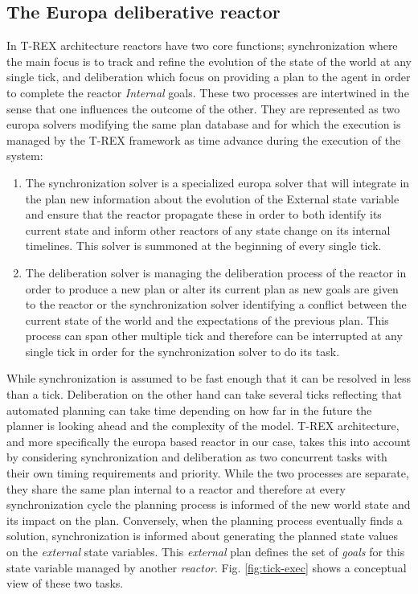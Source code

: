 \subsection{The Europa deliberative reactor}
\label{sec:arch:europa}

In T-REX architecture reactors have two core functions;
synchronization where the main focus is to track and refine the
evolution of the state of the world at any single tick, and
deliberation which focus on providing a plan to the agent in order to
complete the reactor {\em Internal} goals. These two processes are
intertwined in the sense that one influences the outcome of the
other. They are represented as two europa solvers modifying the same
plan database and for which the execution is managed by the T-REX 
framework as time advance during the execution of the system:
\begin{enumerate}
\item The synchronization solver is a specialized europa solver that
  will integrate in the plan new information about the evolution of
  the External state variable and ensure that the reactor propagate
  these in order to both identify its current state and inform
  other reactors of any state change on its internal timelines. This
  solver is summoned at the beginning of every single tick.
\item The deliberation solver is managing the deliberation process of
  the reactor in order to produce a new plan or alter its current plan
  as new goals are given to the reactor or the synchronization solver
  identifying a conflict between the current state of the world and
  the expectations of the previous plan. This process can  span other
  multiple tick and therefore can be interrupted at any single tick in
  order for the synchronization solver to do its task.
\end{enumerate}

While synchronization is assumed to be fast enough that it can be
resolved in less than a tick. Deliberation on the other hand can take
several ticks reflecting that automated planning can take time
depending on how far in the future the planner is looking ahead and
the complexity of the model. T-REX architecture, and more specifically
the europa based reactor in our case, takes this into account by
considering synchronization and deliberation as two concurrent tasks
with their own timing requirements and priority. 
While the two processes are separate, they share the same plan
internal to a reactor and therefore at every synchronization cycle the
planning process is informed of the new world state and its impact on
the plan. Conversely, when the planning process eventually finds a
solution, synchronization is informed about generating the planned
state values on the {\em external} state variables. This {\em
  external} plan defines the set of {\em goals} for this state
variable managed by another {\em reactor}. Fig. \ref{fig:tick-exec}
shows a conceptual view of these two tasks.


